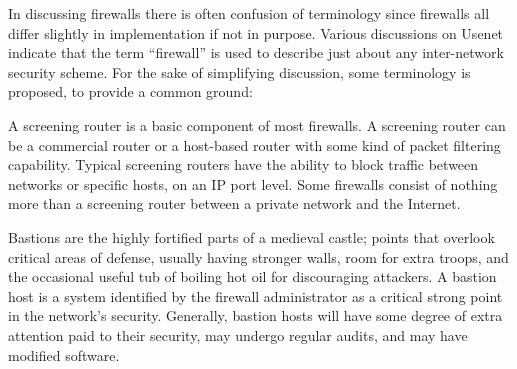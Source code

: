 \begin{htmllist}

    
    In discussing firewalls there is often confusion of terminology since
    firewalls all differ slightly in implementation if not in purpose.
    Various discussions on Usenet indicate that the term ``firewall'' is
    used to describe just about any inter-network security scheme. For the
    sake of simplifying discussion, some terminology is proposed, to
    provide a common ground:\\
    
    \begin{htmllist}
    
  
    A screening router is a basic component of most firewalls. A screening
    router can be a commercial router or a host-based router with some kind
    of packet filtering capability.  Typical screening routers have the
    ability to block traffic between networks or specific hosts, on an IP
    port level. Some firewalls consist of nothing more than a screening
    router between a private network and
    the Internet.\\
    
    
    Bastions are the highly fortified parts of a medieval castle; points
    that overlook critical areas of defense, usually having stronger walls,
    room for extra troops, and the occasional useful tub of boiling hot oil
    for discouraging attackers. A bastion host is a system identified by
    the firewall administrator as a critical strong point in the network's
    security. Generally, bastion hosts will have some degree of extra
    attention paid to their security,
    may undergo regular audits, and may have modified software.\\
    
    

\end{htmllist}
\end{htmllist}

